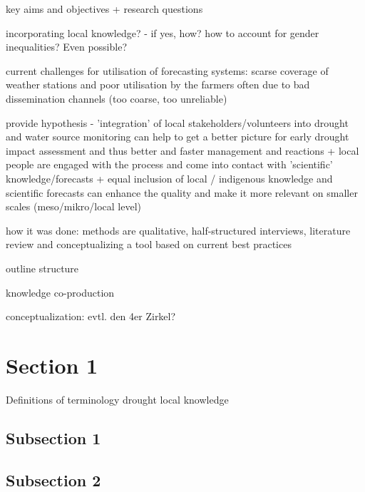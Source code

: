 key aims and objectives + research questions

incorporating local knowledge? - if yes, how?
how to account for gender inequalities? Even possible?

current challenges for utilisation of forecasting systems: scarse coverage of weather stations and poor utilisation by the farmers often due to bad dissemination channels  (too coarse, too unreliable)

provide hypothesis - 'integration' of local stakeholders/volunteers into drought and water source monitoring can help to get a better picture for early drought impact assessment and thus better and faster management and reactions
+ local people are engaged with the process and come into contact with 'scientific' knowledge/forecasts 
+ equal inclusion of local / indigenous knowledge and scientific forecasts can enhance the quality and make it more relevant on smaller scales (meso/mikro/local level)


how it was done: methods are qualitative, half-structured interviews, literature review and conceptualizing a tool based on current best practices

outline structure

knowledge co-production
\autocite{dasInteractiveInformationCrowdsourcing2016}

conceptualization: evtl. den 4er Zirkel?


\section{Section 1}
Definitions of terminology
drought
local knowledge
\subsection{Subsection 1}



\subsection{Subsection 2}


